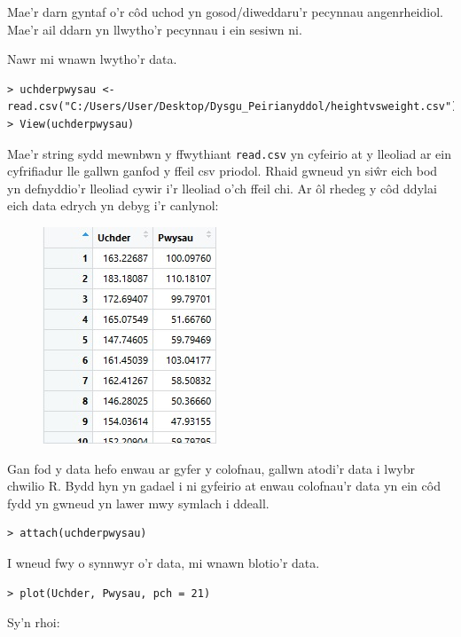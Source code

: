 Mae'r darn gyntaf o'r c\^{o}d uchod yn gosod/diweddaru'r pecynnau angenrheidiol. Mae'r ail ddarn yn llwytho'r pecynnau i ein sesiwn ni.

Nawr mi wnawn lwytho'r data.

\begin{verbatim}
> uchderpwysau <- read.csv("C:/Users/User/Desktop/Dysgu_Peirianyddol/heightvsweight.csv")
> View(uchderpwysau)
\end{verbatim}

Mae'r string sydd mewnbwn y ffwythiant \texttt{read.csv} yn cyfeirio at y lleoliad ar ein cyfrifiadur lle gallwn ganfod y ffeil csv priodol. Rhaid gwneud yn si\^{w}r eich bod yn defnyddio'r lleoliad cywir i'r lleoliad o'ch ffeil chi.
Ar \^{o}l rhedeg y c\^{o}d ddylai eich data edrych yn debyg i'r canlynol: 

\begin{figure}[H]
\begin{center}
\includegraphics[width=0.35\linewidth]{../img/Data_yn_R.jpg}
\end{center}
\label{fig:DataR}
\end{figure}

Gan fod y data hefo enwau ar gyfer y colofnau, gallwn atodi'r data i lwybr chwilio R. Bydd hyn yn gadael i ni gyfeirio at enwau colofnau'r data yn ein c\^{o}d fydd yn gwneud yn lawer mwy symlach i ddeall.

\begin{verbatim}
> attach(uchderpwysau)
\end{verbatim}

I wneud fwy o synnwyr o'r data, mi wnawn blotio'r data.

\begin{verbatim}
> plot(Uchder, Pwysau, pch = 21)
\end{verbatim}

Sy'n rhoi:

